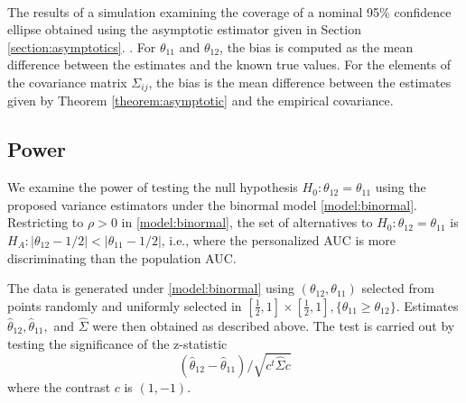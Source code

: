 \documentclass[12pt]{article}
\DeclareMathOperator{\AUC}{AUC}
\newcommand{\cind}{\perp \!\!\! \perp}
\newcommand{\aucindiv}{\theta_{11}}%
\newcommand{\aucpop}{\theta_{12}}%
\newcommand{\aucindivhat}{\hat{\theta}_{11}}%
\newcommand{\aucpophat}{\hat{\theta}_{12}}%
\newcommand{\comment}[1]{
  \iftoggle{commenttoggle}{
    {\normalsize{\color{red}{ #1}}\normalsize}
  }
  {}
}
\begin{document}
\begin{table}
  \\
    \caption{The results of a simulation examining the coverage of a nominal 95\% confidence ellipse obtained using the asymptotic estimator given in Section \ref{section:asymptotics}.\comment{make conssitent order of theta11 vs theta12 columns}. For $\aucindiv$ and $\aucpop$, the bias is computed as the mean difference between the estimates and the known true values. For the elements of the covariance matrix $\Sigma_{ij}$, the bias is the mean difference between the estimates given by Theorem \ref{theorem:asymptotic}   and the empirical covariance.}
    \label{table:1}
\end{table}

%   



\subsection{Power}\label{section:simulation:power}

We examine the power of testing the null hypothesis
$H_0:\aucpop=\aucindiv$ using the proposed variance estimators under
the binormal model \eqref{model:binormal}. Restricting to $\rho>0$ in
\eqref{model:binormal}, the set of alternatives to $H_0:\aucpop=\aucindiv$ is
 $H_A:|\aucpop-1/2|<|\aucindiv-1/2|$, i.e., where the
personalized AUC is more discriminating than the population AUC.

The data is generated under \eqref{model:binormal} using
$(\aucpop,\aucindiv)$ selected from points randomly and uniformly selected in
$[\frac{1}{2},1]\times[\frac{1}{2},1], \{\aucindiv\ge\aucpop\}$. Estimates
$\aucpophat,\aucindivhat,$ and $\hat\Sigma$ were then obtained as described
above. The test is carried out by testing the significance of the
z-statistic
$$
(\aucpophat-\aucindivhat) /
\sqrt{c^t\hat\Sigma c}
$$
where the contrast $c$ is $(1,-1)$.
\end{document}
